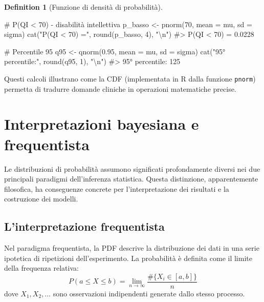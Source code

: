 \documentclass[
  letterpaper,
  DIV=11,
  numbers=noendperiod,
  oneside]{scrreprt}
\newenvironment{Shaded}{\begin{snugshade}}{\end{snugshade}}
\newcommand{\AttributeTok}[1]{\textcolor[rgb]{0.40,0.45,0.13}{#1}}
\newcommand{\CommentTok}[1]{\textcolor[rgb]{0.37,0.37,0.37}{#1}}
\newcommand{\DecValTok}[1]{\textcolor[rgb]{0.68,0.00,0.00}{#1}}
\newcommand{\FloatTok}[1]{\textcolor[rgb]{0.68,0.00,0.00}{#1}}
\newcommand{\FunctionTok}[1]{\textcolor[rgb]{0.28,0.35,0.67}{#1}}
\newcommand{\NormalTok}[1]{\textcolor[rgb]{0.00,0.23,0.31}{#1}}
\newcommand{\OtherTok}[1]{\textcolor[rgb]{0.00,0.23,0.31}{#1}}
\newcommand{\SpecialCharTok}[1]{\textcolor[rgb]{0.37,0.37,0.37}{#1}}
\newcommand{\StringTok}[1]{\textcolor[rgb]{0.13,0.47,0.30}{#1}}
\theoremstyle{definition}
\theoremstyle{plain}
\theoremstyle{definition}
\newtheorem{definition}{Definition}[chapter]
\theoremstyle{remark}
\begin{document}
\begin{definition}[Funzione di densità di
probabilità]
\begin{tcolorbox}
\begin{Shaded}
\begin{Highlighting}[]
\CommentTok{\# P(QI \textless{} 70) {-} disabilità intellettiva}
\NormalTok{p\_basso }\OtherTok{\textless{}{-}} \FunctionTok{pnorm}\NormalTok{(}\DecValTok{70}\NormalTok{, }\AttributeTok{mean =}\NormalTok{ mu, }\AttributeTok{sd =}\NormalTok{ sigma)}
\FunctionTok{cat}\NormalTok{(}\StringTok{"P(QI \textless{} 70) ="}\NormalTok{, }\FunctionTok{round}\NormalTok{(p\_basso, }\DecValTok{4}\NormalTok{), }\StringTok{"}\SpecialCharTok{\textbackslash{}n}\StringTok{"}\NormalTok{)}
\CommentTok{\#\textgreater{} P(QI \textless{} 70) = 0.0228}

\CommentTok{\# Percentile 95}
\NormalTok{q95 }\OtherTok{\textless{}{-}} \FunctionTok{qnorm}\NormalTok{(}\FloatTok{0.95}\NormalTok{, }\AttributeTok{mean =}\NormalTok{ mu, }\AttributeTok{sd =}\NormalTok{ sigma)}
\FunctionTok{cat}\NormalTok{(}\StringTok{"95° percentile:"}\NormalTok{, }\FunctionTok{round}\NormalTok{(q95, }\DecValTok{1}\NormalTok{), }\StringTok{"}\SpecialCharTok{\textbackslash{}n}\StringTok{"}\NormalTok{)}
\CommentTok{\#\textgreater{} 95° percentile: 125}
\end{Highlighting}
\end{Shaded}

Questi calcoli illustrano come la CDF (implementata in R dalla funzione
\texttt{pnorm}) permetta di tradurre domande cliniche in operazioni
matematiche precise.

\end{tcolorbox}

\section{Interpretazioni bayesiana e
frequentista}\label{interpretazioni-bayesiana-e-frequentista}

Le distribuzioni di probabilità assumono significati profondamente
diversi nei due principali paradigmi dell'inferenza statistica. Questa
distinzione, apparentemente filosofica, ha conseguenze concrete per
l'interpretazione dei risultati e la costruzione dei modelli.

\subsection{L'interpretazione
frequentista}\label{linterpretazione-frequentista}

Nel paradigma frequentista, la PDF descrive la distribuzione dei dati in
una serie ipotetica di ripetizioni dell'esperimento. La probabilità è
definita come il limite della frequenza relativa: \[
P(a \leq X \leq b) = \lim_{n \to \infty} \frac{\#\{X_i \in [a, b]\}}{n}
\] dove \(X_1, X_2, \ldots\) sono osservazioni indipendenti generate
dallo stesso processo.


\end{definition}
\end{document}
